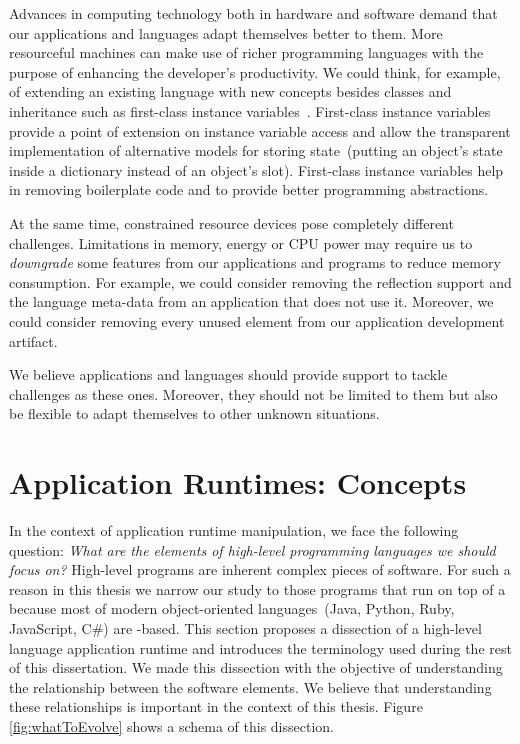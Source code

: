 Advances in computing technology both in hardware and software demand that our applications and languages adapt themselves better to them. More resourceful machines can make use of richer programming languages with the purpose of enhancing the developer's productivity. We could think, for example, of extending an existing language with new concepts besides classes and inheritance such as first-class instance variables~\cite{Verw11a}. First-class instance variables provide a point of extension on instance variable access and allow the transparent implementation of alternative models for storing state~(\eg putting an object's state inside a dictionary instead of an object's slot). First-class instance variables help in removing boilerplate code and to provide better programming abstractions.

At the same time, constrained resource devices pose completely different challenges. Limitations in memory, energy or CPU power may require us to \emph{downgrade} some features from our applications and programs to reduce memory consumption. For example, we could consider removing the reflection support and the language meta-data from an application that does not use it. Moreover, we could consider removing every unused element from our application development artifact.

We believe applications and languages should provide support to tackle challenges as these ones. Moreover, they should not be limited to them but also be flexible to adapt themselves to other unknown situations.

\section{Application Runtimes: Concepts}

In the context of application runtime manipulation, we face the following question: \emph{What are the elements of high-level programming languages we should focus on?} High-level programs are inherent complex pieces of software. For such a reason in this thesis we narrow our study to those programs that run on top of a \VM because most of modern object-oriented languages~(\eg Java, Python, Ruby, JavaScript, C\#) are \VM-based.
This section proposes a dissection of a high-level language application runtime and introduces the terminology used during the rest of this dissertation. We made this dissection with the objective of understanding the relationship between the software elements. We believe that understanding these relationships is important in the context of this thesis. Figure \ref{fig:whatToEvolve} shows a schema of this dissection.

